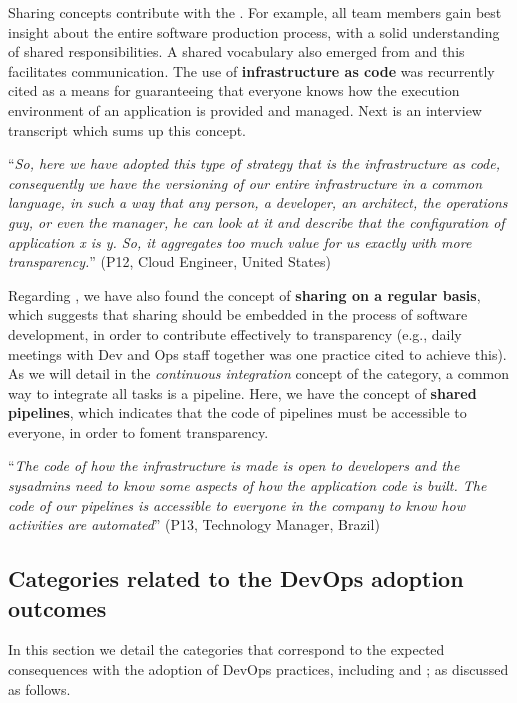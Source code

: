Sharing concepts contribute with the \cc. For example,
all team members gain best insight about the entire software production
process, with a solid understanding of shared responsibilities. A shared vocabulary also
emerged from  and this facilitates communication.
The use of \textbf{infrastructure as code} was
recurrently cited as a means for guaranteeing that everyone knows how the execution environment of
an application is provided and managed. Next is an interview
transcript which sums up this concept.

\begin{mq}
``\emph{So, here we have adopted this type of strategy that is the infrastructure as code,
consequently we have the versioning of our entire
infrastructure in a common language, in such a way that any person, a
developer, an architect, the operations guy, or even the manager, he can look
at it and describe that the configuration of application x is y. So, it
aggregates too much value for us exactly with more transparency.}'' (P12, Cloud Engineer, United States)
\end{mq}

Regarding , we have also found the concept of
\textbf{sharing on a regular basis}, which suggests that sharing should be
embedded in the process of software development, in order to contribute
effectively to transparency (e.g., daily meetings with Dev and Ops staff
together was one practice cited to achieve this).
As we will detail in the \emph{continuous integration} concept of
the  category, a common way to integrate all tasks is a pipeline.
Here, we have the
concept of \textbf{shared pipelines}, which indicates that the code of pipelines
must be accessible to everyone, in order to foment transparency.

\begin{mq}
``\emph{The code of how the infrastructure is
made is open to developers and the sysadmins need to know some aspects of how
the application code is built. The code of our pipelines is accessible to
everyone in the company to know how activities are automated}'' (P13, Technology
Manager, Brazil)
\end{mq}


\subsection{Categories related to the DevOps adoption outcomes}

In this section we detail the categories that correspond to
the expected consequences with the adoption of
DevOps practices, including  and ;
as discussed as follows.


